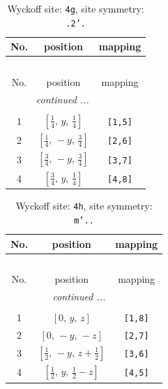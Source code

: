 \documentclass[fleqn,8pt]{jsarticle}
\begin{document}
\renewcommand{\arraystretch}{1.2}
\begin{longtable}{ccc}
\caption{Wyckoff site: {\tt 4g}, site symmetry: {\tt .2'.}}
 \\
 \hline \hline
No. & position & mapping \\ \hline \endfirsthead

\multicolumn{2}{l}{\tablename\ \thetable{}} \\
 \hline \hline
No. & position & mapping \\ \hline \endhead

 \hline \hline
\multicolumn{2}{r}{\footnotesize\it continued ...} \\ \endfoot

 \hline \hline
\multicolumn{2}{r}{} \\ \endlastfoot

1 & $\left[ \frac{1}{4},\, y,\, \frac{1}{4} \right]$ & {\tt [1,5]} \\ \hline
2 & $\left[ \frac{1}{4},\, - y,\, \frac{3}{4} \right]$ & {\tt [2,6]} \\ \hline
3 & $\left[ \frac{3}{4},\, - y,\, \frac{3}{4} \right]$ & {\tt [3,7]} \\ \hline
4 & $\left[ \frac{3}{4},\, y,\, \frac{1}{4} \right]$ & {\tt [4,8]} \\
\end{longtable}
\renewcommand{\arraystretch}{1.2}
\begin{longtable}{ccc}
\caption{Wyckoff site: {\tt 4h}, site symmetry: {\tt m'..}}
 \\
 \hline \hline
No. & position & mapping \\ \hline \endfirsthead

\multicolumn{2}{l}{\tablename\ \thetable{}} \\
 \hline \hline
No. & position & mapping \\ \hline \endhead

 \hline \hline
\multicolumn{2}{r}{\footnotesize\it continued ...} \\ \endfoot

 \hline \hline
\multicolumn{2}{r}{} \\ \endlastfoot

1 & $\left[ 0,\, y,\, z \right]$ & {\tt [1,8]} \\ \hline
2 & $\left[ 0,\, - y,\, - z \right]$ & {\tt [2,7]} \\ \hline
3 & $\left[ \frac{1}{2},\, - y,\, z + \frac{1}{2} \right]$ & {\tt [3,6]} \\ \hline
4 & $\left[ \frac{1}{2},\, y,\, \frac{1}{2} - z \right]$ & {\tt [4,5]} \\
\end{longtable}
\end{document}
